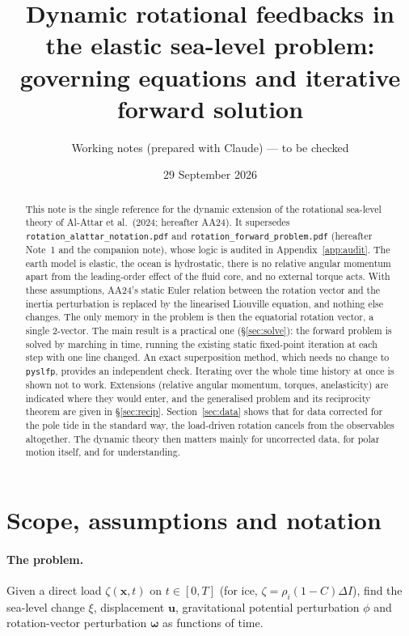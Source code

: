 \documentclass[11pt,a4paper]{article}
\title{Dynamic rotational feedbacks in the elastic sea-level problem:\\
governing equations and iterative forward solution}
\author{Working notes (prepared with Claude) --- to be checked}
\date{29 September 2026}
\newcommand{\bw}{\bm{\omega}}
\newcommand{\bx}{\mathbf{x}}
\newcommand{\bu}{\mathbf{u}}
\begin{document}
\maketitle

\begin{abstract}
\noindent
This note is the single reference for the dynamic extension of the rotational sea-level theory of
Al-Attar et al.\ (2024; hereafter AA24). It supersedes \texttt{rotation\_alattar\_notation.pdf} and
\texttt{rotation\_forward\_problem.pdf} (hereafter Note~1 and the companion note), whose logic is
audited in Appendix~\ref{app:audit}. The earth model is elastic, the ocean is hydrostatic, there is
no relative angular momentum apart from the leading-order effect of the fluid core, and no external
torque acts. With these assumptions, AA24's static Euler relation between the rotation vector and
the inertia perturbation is replaced by the linearised Liouville equation, and nothing else
changes. The only memory in the problem is then the equatorial rotation vector, a single 2-vector.
The main result is a practical one (\S\ref{sec:solve}): the forward problem is solved by marching in time,
running the existing static fixed-point iteration at each step with one line changed. An exact
superposition method, which needs no change to \texttt{pyslfp}, provides an independent check.
Iterating over the whole time history at once is shown not to work. Extensions (relative angular
momentum, torques, anelasticity) are indicated where they would enter, and the generalised
problem and its reciprocity theorem are given in \S\ref{sec:recip}. Section~\ref{sec:data} shows
that for data corrected for the pole tide in the standard way, the load-driven rotation cancels from
the observables altogether. The dynamic theory then matters mainly for uncorrected data, for polar
motion itself, and for understanding.
\end{abstract}

\tableofcontents

\section{Scope, assumptions and notation}
\label{sec:scope}

\paragraph{The problem.} Given a direct load $\zeta(\bx,t)$ on $t\in[0,T]$ (for ice,
$\zeta=\rho_i(1-C)\Delta I$), find the sea-level change $\xi$, displacement $\bu$, gravitational
potential perturbation $\phi$ and rotation-vector perturbation $\bw$ as functions of time.
\end{document}
